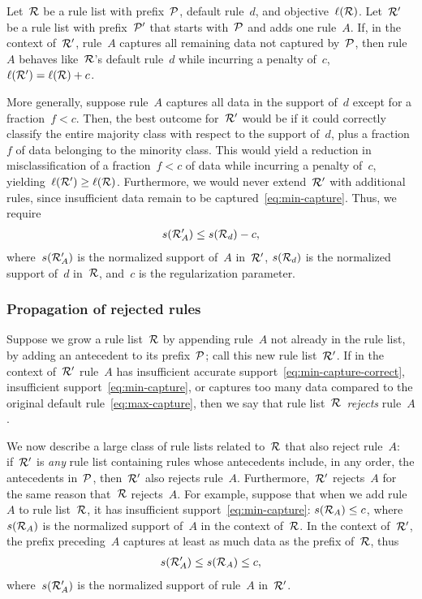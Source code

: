 Let~${\mathcal R}$ be a rule list with prefix~${\mathcal P}$, default rule~$d$, and objective~$\ell({\mathcal R})$.
%
Let~${\mathcal R}'$ be a rule list with prefix~${\mathcal P}'$ that starts with~${\mathcal P}$ and adds one rule~$A$.
%
If, in the context of~${\mathcal R}'$, rule~$A$ captures all remaining data not captured by~${\mathcal P}$,
then rule~$A$ behaves like~${\mathcal R}$'s default rule~$d$ while incurring a penalty of~$c$,
\ie ~${\ell({\mathcal R}') = \ell({\mathcal R}) + c}$.

More generally, suppose rule~$A$ captures all data in the support of~$d$
except for a fraction~${f < c}$.
%
Then, the best outcome for~${\mathcal R}'$ would be if it could correctly classify
the entire majority class with respect to the support of~$d$,
plus a fraction~$f$ of data belonging to the minority class.
%
This would yield a reduction in misclassification of a fraction~${f < c}$
of data while incurring a penalty of~$c$, yielding~${\ell({\mathcal R}') \ge \ell({\mathcal R})}$.
%
Furthermore, we would never extend~${\mathcal R}'$ with additional rules,
since insufficient data remain to be captured~\eqref{eq:min-capture}.
%
Thus, we require
\begin{align}
s(\RL'_A) \le s(\RL_d) - c,
\label{eq:max-capture}
\end{align}
where~$s({\mathcal R}'_A)$ is the normalized support of~$A$ in~${\mathcal R}'$,
$s({\mathcal R}_d)$ is the normalized support of~$d$ in~${\mathcal R}$,
and~$c$ is the regularization parameter.

\subsubsection{Propagation of rejected rules}

Suppose we grow a rule list~${\mathcal R}$ by appending rule~$A$ not already in the rule list,
\ie by adding an antecedent to its prefix~${\mathcal P}$; call this new rule list~${\mathcal R}'$.
%
If in the context of~${\mathcal R}'$ rule~$A$ has insufficient accurate support~\eqref{eq:min-capture-correct},
insufficient support~\eqref{eq:min-capture},
or captures too many data compared to the original default rule~\eqref{eq:max-capture},
then we say that rule list~${\mathcal R}$~\emph{rejects} rule~$A$.

We now describe a large class of rule lists related to~${\mathcal R}$ that also reject rule~$A$:
if~${\mathcal R}'$ is \emph{any} rule list containing rules whose antecedents include,
in any order, the antecedents in~${\mathcal P}$, then~${\mathcal R}'$ also rejects rule~$A$.
%
Furthermore,~${\mathcal R}'$ rejects~$A$ for the same reason that~${\mathcal R}$ rejects~$A$.
%
For example, suppose that when we add rule~$A$ to rule list~${\mathcal R}$,
it has insufficient support~\eqref{eq:min-capture}: ${s({\mathcal R}_A) \le c}$,
where~$s({\mathcal R}_A)$ is the normalized support of~$A$ in the context of~${\mathcal R}$.
%
In the context of~${\mathcal R}'$, the prefix preceding~$A$ captures at least
as much data as the prefix of~${\mathcal R}$, thus
\begin{align}
s(\RL'_A) \le s(\RL_A) \le c,
\end{align}
where~$s({\mathcal R}'_A)$ is the normalized support of rule~$A$ in~${\mathcal R}'$.

